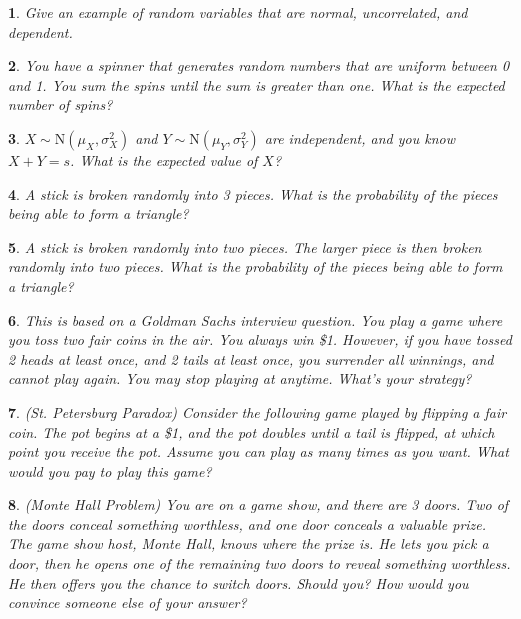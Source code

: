 \documentclass{report}
\newtheorem{problem}{}
\numberwithin{problem}{chapter} %
\begin{document}
\begin{problem}
Give an example of random variables that are normal, uncorrelated, and dependent.
\end{problem}

\begin{problem}
You have a spinner that generates random numbers that are uniform between 0 and 1. You sum the spins until the sum is greater than one. What is the expected number of spins?
\end{problem}

\begin{problem}
$X \sim \mbox{N}(\mu_X, \sigma^2_X)$ and $Y \sim \mbox{N}(\mu_Y, \sigma^2_Y)$ are independent, and you know $X+Y=s$. What is the expected value of $X$? 
\end{problem}

\begin{problem}
A stick is broken randomly into 3 pieces. What is the probability of the pieces being able to form a triangle?
\end{problem}

\begin{problem}
A stick is broken randomly into two pieces. The larger piece is then broken randomly into two pieces. What is the probability of the pieces being able to form a triangle?
\end{problem}

\begin{problem}
This is based on a Goldman Sachs interview question. You play a game where you toss two fair coins in the air. You always win \$1. However, if you have tossed 2 heads at least once, and 2 tails at least once, you surrender all winnings, and cannot play again. You may stop playing at anytime. What's your strategy? 
\end{problem}

\begin{problem}
(St. Petersburg Paradox) Consider the following game played by flipping a fair coin. The pot begins at a \$1, and the pot doubles until a tail is flipped, at which point you receive the pot. Assume you can play as many times as you want. What would you pay to play this game? 
\end{problem}

\begin{problem}
(Monte Hall Problem) You are on a game show, and there are 3 doors. Two of the doors conceal something worthless, and one door conceals a valuable prize. The game show host, Monte Hall, knows where the prize is. He lets you pick a door, then he opens one of the remaining two doors to reveal something worthless. He then offers you the chance to switch doors. Should you? How would you convince someone else of your answer?
\end{problem}
\end{document}
